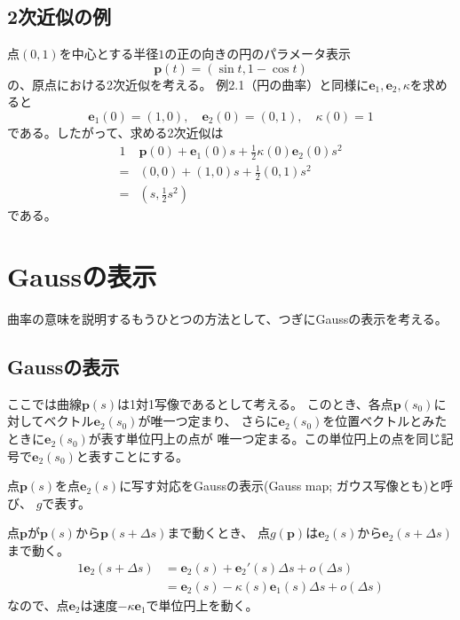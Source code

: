 \documentclass[a4j,disablejfam,dvipdfmx,papersize,slide,uplatex,21pt]{jsarticle}
\begin{document}
\newpage
\subsection*{2次近似の例}
点$(0, 1)$を中心とする半径$1$の正の向きの円のパラメータ表示
\begin{equation}
    \bm{p}(t) = \left(\sin t, 1 - \cos t\right)
\end{equation}
の、原点における2次近似を考える。
例2.1（円の曲率）と同様に$\bm{e}_1, \bm{e}_2, \kappa$を求めると
\begin{equation}
    \bm{e}_1(0) = (1, 0),\quad
    \bm{e}_2(0) = (0, 1),\quad
    \kappa(0) = 1
\end{equation}
である。したがって、求める2次近似は
\begin{alignat}{1}
      &\bm{p}(0) + \bm{e}_1(0) s + \frac{1}{2} \kappa(0) \bm{e}_2(0) s^2 \\
    = &(0, 0) + (1, 0) s + \frac{1}{2} (0, 1) s^2 \\
    = &\left(s, \frac{1}{2} s^2\right)
\end{alignat}
である。




\section{Gaussの表示}
曲率の意味を説明するもうひとつの方法として、つぎにGaussの表示を考える。

\newpage
\subsection*{Gaussの表示}
ここでは曲線$\bm{p}(s)$は1対1写像であるとして考える。
このとき、各点$\bm{p}(s_0)$に対してベクトル$\bm{e}_2(s_0)$が唯一つ定まり、
さらに$\bm{e}_2(s_0)$を位置ベクトルとみたときに$\bm{e}_2(s_0)$が表す単位円上の点が
唯一つ定まる。この単位円上の点を同じ記号で$\bm{e}_2(s_0)$と表すことにする。

点$\bm{p}(s)$を点$\bm{e}_2(s)$に写す対応をGaussの表示(Gauss map; ガウス写像とも)と呼び、
$g$で表す。

\newpage
点$\bm{p}$が$\bm{p}(s)$から$\bm{p}(s + \Delta s)$まで動くとき、
点$g(\bm{p})$は$\bm{e}_2(s)$から$\bm{e}_2(s + \Delta s)$まで動く。
\begin{alignat}{1}
    \bm{e}_2(s + \Delta s)
        &= \bm{e}_2(s) + \bm{e}_2'(s) \Delta s + o(\Delta s) \\
        &= \bm{e}_2(s) - \kappa(s) \bm{e}_1(s) \Delta s + o(\Delta s)
\end{alignat}
なので、点$\bm{e}_2$は速度$-\kappa\bm{e}_1$で単位円上を動く。
\end{document}
